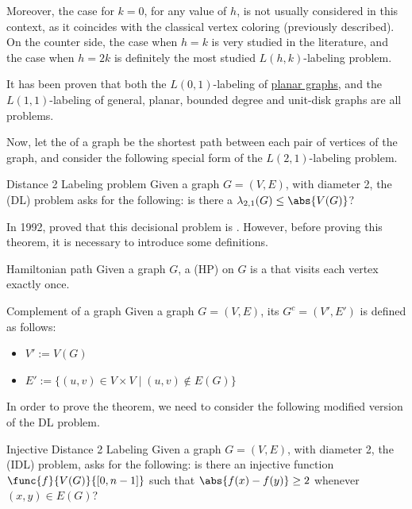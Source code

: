 \documentclass[a4paper, 12pt]{report}
\begin{document}
    Moreover, the case for $k = 0$, for any value of $h$, is not usually considered in this context, as it coincides with the classical vertex coloring (previously described). On the counter side, the case when $h = k$ is very studied in the literature, and the case when $h = 2k$ is definitely the most studied $L(h, k)$-labeling problem.

    It has been proven that both the $L(0,1)$-labeling of \href{https://en.wikipedia.org/wiki/Planar_graph}{planar graphs}, and the $L(1,1)$-labeling of general, planar, bounded degree and unit-disk graphs are all \NPComplete problems.

    Now, let the  of a graph be the shortest path between each pair of vertices of the graph, and consider the following special form of the $L(2,1)$-labeling problem.

    \begin{frameddefn}{Distance 2 Labeling problem}
        Given a graph $G = (V, E)$, with diameter 2, the   (DL) problem asks for the following: is there a $\lambda_{2,1}(G) \le \abs{V(G)}$?
    \end{frameddefn}

    In 1992, \textcite{griggs} proved that this decisional problem is \NPComplete. However, before proving this theorem, it is necessary to introduce some definitions.

    \begin{frameddefn}{Hamiltonian path}
        Given a graph $G$, a  (HP) on $G$ is a  that visits each vertex exactly once.
    \end{frameddefn}

    \begin{frameddefn}{Complement of a graph}
        Given a graph $G = (V, E)$, its  $G^c = (V', E')$ is defined as follows:

        \begin{itemize}
            \item $V' := V(G)$
            \item $E' := \{(u, v) \in V \times V \mid (u,v) \notin E(G)\}$
        \end{itemize}
    \end{frameddefn}

    In order to prove the theorem, we need to consider the following modified version of the DL problem.

    \begin{frameddefn}{Injective Distance 2 Labeling}
        Given a graph $G = (V, E)$, with diameter 2, the  (IDL) problem, asks for the following: is there an injective function $\func{f}{V(G)}{[0, n - 1]}$ such that $\abs{f(x)- f(y)} \ge 2$ whenever $(x, y) \in E(G)$?
    \end{frameddefn}
\end{document}
